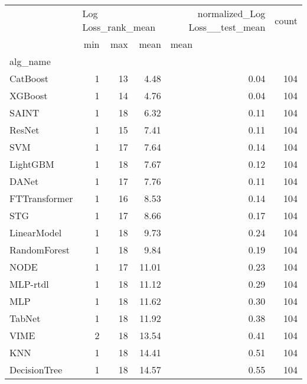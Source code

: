 \begin{tabular}{lrrrrr}
\toprule
{} & \multicolumn{3}{l}{Log Loss_rank_mean} & normalized_Log Loss__test_mean & count \\
{} &                min & max &   mean & \multicolumn{2}{l}{mean} \\
alg_name      &                    &     &        &                                &       \\
\midrule
CatBoost      &                  1 &  13 &   4.48 &                           0.04 &   104 \\
XGBoost       &                  1 &  14 &   4.76 &                           0.04 &   104 \\
SAINT         &                  1 &  18 &   6.32 &                           0.11 &   104 \\
ResNet        &                  1 &  15 &   7.41 &                           0.11 &   104 \\
SVM           &                  1 &  17 &   7.64 &                           0.14 &   104 \\
LightGBM      &                  1 &  18 &   7.67 &                           0.12 &   104 \\
DANet         &                  1 &  17 &   7.76 &                           0.11 &   104 \\
FTTransformer &                  1 &  16 &   8.53 &                           0.14 &   104 \\
STG           &                  1 &  17 &   8.66 &                           0.17 &   104 \\
LinearModel   &                  1 &  18 &   9.73 &                           0.24 &   104 \\
RandomForest  &                  1 &  18 &   9.84 &                           0.19 &   104 \\
NODE          &                  1 &  17 &  11.01 &                           0.23 &   104 \\
MLP-rtdl      &                  1 &  18 &  11.12 &                           0.29 &   104 \\
MLP           &                  1 &  18 &  11.62 &                           0.30 &   104 \\
TabNet        &                  1 &  18 &  11.92 &                           0.38 &   104 \\
VIME          &                  2 &  18 &  13.54 &                           0.41 &   104 \\
KNN           &                  1 &  18 &  14.41 &                           0.51 &   104 \\
DecisionTree  &                  1 &  18 &  14.57 &                           0.55 &   104 \\
\bottomrule
\end{tabular}
